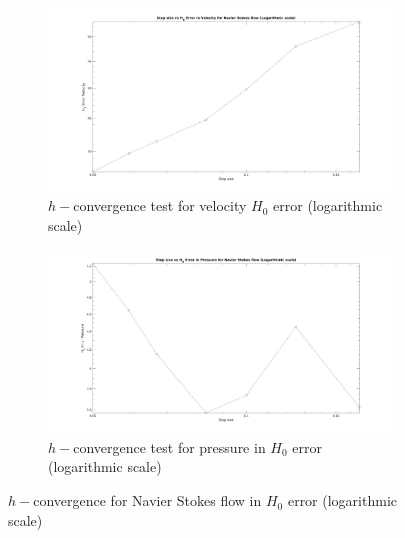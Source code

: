 \documentclass[a4paper,openany]{book}
\begin{document}
\begin{figure}
\begin{subfigure}{\textwidth}	
  \includegraphics[width=\linewidth]{H0_convergence_velocity_n_s_log.jpg}
  \caption{$h-$convergence test for velocity $H_0$ error (logarithmic scale)}
  \label{fig:vel_navier_stoke_conv_log_h0}
\end{subfigure}
\begin{subfigure}{\textwidth}	
  \includegraphics[width=\linewidth]{H0_convergence_pressure_n_s_log.jpg}
  \caption{$h-$convergence test for pressure in $H_0$ error (logarithmic scale)}
  \label{fig:pre_navier_stoke_conv_log_h0}
\end{subfigure}
\caption{$h-$convergence for Navier Stokes flow in $H_0$ error (logarithmic scale)}
\label{navier_stoke_conv_h0_log}
\end{figure}
\end{document}

